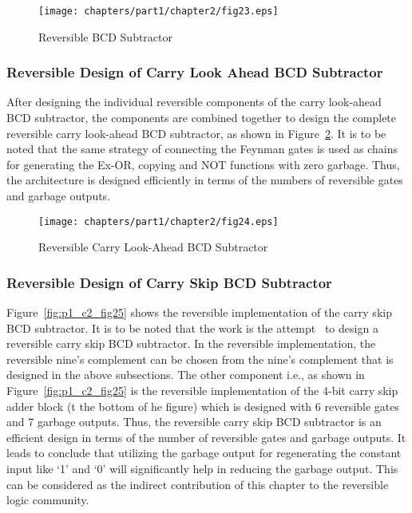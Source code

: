 \begin{figure}[!tbh]
\centering
\texttt{[image: chapters/part1/chapter2/fig23.eps]}
\caption{Reversible BCD Subtractor}
\label{fig:p1_c2_fig23}
\end{figure}

\subsubsection{Reversible Design of Carry Look Ahead BCD Subtractor}

After designing the individual reversible components of the carry look-ahead BCD subtractor, the components are combined together to design the complete reversible carry look-ahead BCD subtractor, as shown in Figure~\ref{fig:p1_c2_fig24}. It is to be noted that the same strategy of connecting the Feynman gates is used as chains for generating the Ex-OR, copying and NOT functions with zero garbage. Thus, the architecture is designed efficiently in terms of the numbers of reversible gates and garbage outputs.

\begin{figure}[!tbh]
\centering
\texttt{[image: chapters/part1/chapter2/fig24.eps]}
\caption{Reversible Carry Look-Ahead BCD Subtractor}
\label{fig:p1_c2_fig24}
\end{figure}

\subsubsection{Reversible Design of Carry Skip BCD Subtractor}

\noindent Figure~\ref{fig:p1_c2_fig25} shows the reversible implementation of the carry skip BCD subtractor. It is to be noted that the work is the attempt~ to design a reversible carry skip BCD subtractor. In the reversible implementation, the reversible nine's complement can be chosen from the nine's complement that is designed in the above subsections. The other component i.e., as shown in Figure~\ref{fig:p1_c2_fig25} is the reversible implementation of the 4-bit carry skip adder block (t the bottom of he figure) which is designed with 6 reversible gates and 7 garbage outputs. Thus, the reversible carry skip BCD subtractor is an efficient design in terms of the number of reversible gates and garbage outputs. It leads to conclude that utilizing the garbage output for regenerating the constant input like `1' and `0' will significantly help in reducing the garbage output. This can be considered as the indirect contribution of this chapter to the reversible logic community.


